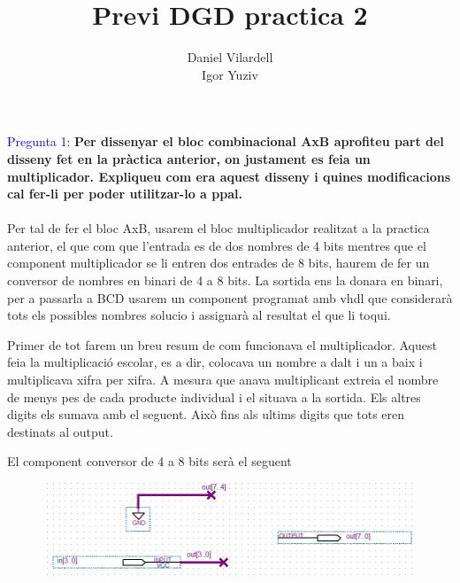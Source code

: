 \documentclass[12pt, a4papre]{article}
\author{Daniel Vilardell\\
	   Igor Yuziv}
\title{Previ DGD practica 2}
\date{}
\begin{document}
	\maketitle

	\textcolor{blue}{Pregunta 1:} \textbf{Per dissenyar el bloc combinacional AxB aprofiteu part del disseny fet en la pràctica anterior, on justament es feia un multiplicador. Expliqueu com era aquest disseny i quines modificacions cal fer-li per poder utilitzar-lo a ppal.}\\\\
	
	Per tal de fer el bloc AxB, usarem el bloc multiplicador realitzat a la practica anterior, el que com que l'entrada es de dos nombres de 4 bits mentres que el component multiplicador se li entren dos entrades de 8 bits, haurem de fer un conversor de nombres en binari de 4 a 8 bits. La sortida ens la donara en binari, per a passarla a BCD usarem un component programat amb vhdl que considerarà tots els possibles nombres solucio i assignarà al resultat el que li toqui.
	
	Primer de tot farem un breu resum de com funcionava el multiplicador. Aquest feia la multiplicació escolar, es a dir, colocava un nombre a dalt i un a baix i multiplicava xifra per xifra. A mesura que anava multiplicant extreia el nombre de menys pes de cada producte individual i el situava a la sortida. Els altres digits els sumava amb el seguent. Això fins als ultims digits que tots eren destinats al output.
	
	El component conversor de 4 a 8 bits serà el seguent
	
	\begin{figure}[H]
		\begin{center}
		\includegraphics[width=150mm]{Pregunta1_1.jpeg}
		\end{center}
	\end{figure}
	
\end{document}
